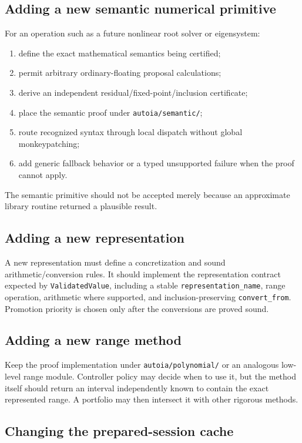 \documentclass[11pt]{article}
\newcommand{\codepath}[1]{\nolinkurl{#1}}
\begin{document}
\subsection{Adding a new semantic numerical primitive}

For an operation such as a future nonlinear root solver or eigensystem:
\begin{enumerate}[leftmargin=*]
\item define the exact mathematical semantics being certified;
\item permit arbitrary ordinary-floating proposal calculations;
\item derive an independent residual/fixed-point/inclusion certificate;
\item place the semantic proof under \codepath{autoia/semantic/};
\item route recognized syntax through local dispatch without global monkeypatching;
\item add generic fallback behavior or a typed unsupported failure when the proof
cannot apply.
\end{enumerate}
The semantic primitive should not be accepted merely because an approximate
library routine returned a plausible result.

\subsection{Adding a new representation}

A new representation must define a concretization and sound arithmetic/conversion
rules.  It should implement the representation contract expected by
\texttt{ValidatedValue}, including a stable \texttt{representation\_name}, range
operation, arithmetic where supported, and inclusion-preserving
\texttt{convert\_from}.  Promotion priority is chosen only after the conversions
are proved sound.

\subsection{Adding a new range method}

Keep the proof implementation under \codepath{autoia/polynomial/} or an analogous
low-level range module.  Controller policy may decide when to use it, but the
method itself should return an interval independently known to contain the exact
represented range.  A portfolio may then intersect it with other rigorous
methods.

\subsection{Changing the prepared-session cache}
\end{document}
